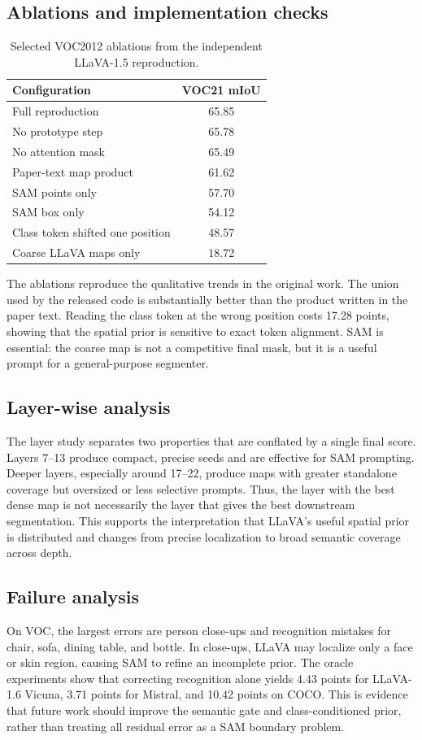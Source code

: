 \documentclass{article}
\newcommand{\miou}{mIoU}
\begin{document}
\subsection{Ablations and implementation checks}
\begin{table}[t]
\centering
\caption{Selected VOC2012 ablations from the independent LLaVA-1.5 reproduction.}
\label{tab:ablation}
\begin{tabular}{lc}
\toprule
Configuration & VOC21 \miou{}\\
\midrule
Full reproduction & 65.85\\
No prototype step & 65.78\\
No attention mask & 65.49\\
Paper-text map product & 61.62\\
SAM points only & 57.70\\
SAM box only & 54.12\\
Class token shifted one position & 48.57\\
Coarse LLaVA maps only & 18.72\\
\bottomrule
\end{tabular}
\end{table}

The ablations reproduce the qualitative trends in the original work. The union used by the
released code is substantially better than the product written in the paper text. Reading the
class token at the wrong position costs 17.28 points, showing that the spatial prior is sensitive
to exact token alignment. SAM is essential: the coarse map is not a competitive final mask, but
it is a useful prompt for a general-purpose segmenter.

\subsection{Layer-wise analysis}
The layer study separates two properties that are conflated by a single final score. Layers 7--13
produce compact, precise seeds and are effective for SAM prompting. Deeper layers, especially
around 17--22, produce maps with greater standalone coverage but oversized or less selective
prompts. Thus, the layer with the best dense map is not necessarily the layer that gives the best
downstream segmentation. This supports the interpretation that LLaVA's useful spatial prior is
distributed and changes from precise localization to broad semantic coverage across depth.

\subsection{Failure analysis}
On VOC, the largest errors are person close-ups and recognition mistakes for chair, sofa, dining
table, and bottle. In close-ups, LLaVA may localize only a face or skin region, causing SAM to
refine an incomplete prior. The oracle experiments show that correcting recognition alone yields
4.43 points for LLaVA-1.6 Vicuna, 3.71 points for Mistral, and 10.42 points on COCO. This is
evidence that future work should improve the semantic gate and class-conditioned prior, rather
than treating all residual error as a SAM boundary problem.
\end{document}
